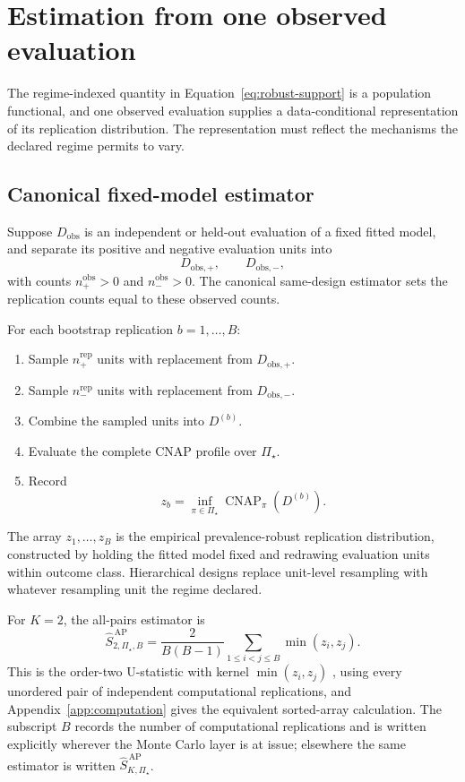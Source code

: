 \documentclass[11pt]{article}
\newcommand{\CNAP}{\operatorname{CNAP}}
\newcommand{\PSet}{\Pi_\star}
\newcommand{\SRobHat}{\widehat S_{K,\PSet}^{\,\mathrm{AP}}}
\theoremstyle{remark}
\begin{document}
\section{Estimation from one observed evaluation}
\label{sec:estimation}

The regime-indexed quantity in Equation~\eqref{eq:robust-support} is a population functional, and one observed evaluation supplies a data-conditional representation of its replication distribution. The representation must reflect the mechanisms the declared regime permits to vary.

\subsection{Canonical fixed-model estimator}

Suppose $D_{\mathrm{obs}}$ is an independent or held-out evaluation of a fixed fitted model, and separate its positive and negative evaluation units into
\[
D_{\mathrm{obs},+},
\qquad
D_{\mathrm{obs},-},
\]
with counts $n_+^{\mathrm{obs}}>0$ and $n_-^{\mathrm{obs}}>0$. The canonical same-design estimator sets the replication counts equal to these observed counts.

For each bootstrap replication $b=1,\ldots,B$:
\begin{enumerate}
\item Sample $n_+^{\mathrm{rep}}$ units with replacement from $D_{\mathrm{obs},+}$.
\item Sample $n_-^{\mathrm{rep}}$ units with replacement from $D_{\mathrm{obs},-}$.
\item Combine the sampled units into $D^{(b)}$.
\item Evaluate the complete CNAP profile over $\PSet$.
\item Record
\begin{equation}
z_b
=
\inf_{\pi\in\PSet}
\CNAP_\pi(D^{(b)}).
\label{eq:bootstrap-robust-effect}
\end{equation}
\end{enumerate}

The array $z_1,\ldots,z_B$ is the empirical prevalence-robust replication distribution, constructed by holding the fitted model fixed and redrawing evaluation units within outcome class. Hierarchical designs replace unit-level resampling with whatever resampling unit the regime declared.

For $K=2$, the all-pairs estimator is
\begin{equation}
\widehat S_{2,\PSet,B}^{\,\mathrm{AP}}
=
\frac{2}{B(B-1)}
\sum_{1\leq i<j\leq B}
\min(z_i,z_j).
\label{eq:all-pairs-estimator}
\end{equation}
This is the order-two U-statistic with kernel $\min(z_i,z_j)$ \cite{hoeffding1948ustat}, using every unordered pair of independent computational replications, and Appendix~\ref{app:computation} gives the equivalent sorted-array calculation. The subscript $B$ records the number of computational replications and is written explicitly wherever the Monte Carlo layer is at issue; elsewhere the same estimator is written $\SRobHat$.
\end{document}
